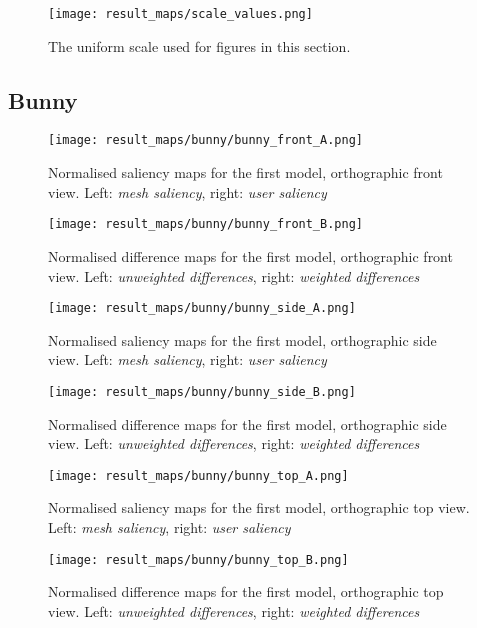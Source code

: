 \begin{figure}[htb]
	\centering
	\texttt{[image: result\_maps/scale\_values.png]}\\ %
	\caption{The uniform scale used for figures in this section.}
	\label{fig:results_scale}
\end{figure}

\FloatBarrier
		\subsection{Bunny}
		\label{sec:results_bunny}
%
%
\begin{figure}[!htb]
	\centering
	\texttt{[image: result\_maps/bunny/bunny\_front\_A.png]}\\ %
	\caption{Normalised saliency maps for the first model, orthographic front view. Left: \textit{mesh saliency}, right: \textit{user saliency}}
	\label{fig:results_bunny_front_a}
\end{figure}
\begin{figure}[!htb]
	\centering
	\texttt{[image: result\_maps/bunny/bunny\_front\_B.png]}\\ %
	\caption{Normalised difference maps for the first model, orthographic front view. Left: \textit{unweighted differences}, right: \textit{weighted differences}}
	\label{fig:results_bunny_front_b}
\end{figure}

\begin{figure}[!htb]
	\centering
	\texttt{[image: result\_maps/bunny/bunny\_side\_A.png]}\\ %
	\caption{Normalised saliency maps for the first model, orthographic side view. Left: \textit{mesh saliency}, right: \textit{user saliency}}
	\label{fig:results_bunny_side_a}
\end{figure}
\begin{figure}[!htb]
	\centering
	\texttt{[image: result\_maps/bunny/bunny\_side\_B.png]}\\ %
	\caption{Normalised difference maps for the first model, orthographic side view. Left: \textit{unweighted differences}, right: \textit{weighted differences}}
	\label{fig:results_bunny_side_b}
\end{figure}

\begin{figure}[!htb]
	\centering
	\texttt{[image: result\_maps/bunny/bunny\_top\_A.png]}\\ %
	\caption{Normalised saliency maps for the first model, orthographic top view. Left: \textit{mesh saliency}, right: \textit{user saliency}}
	\label{fig:results_bunny_top_a}
\end{figure}
\begin{figure}[!htb]
	\centering
	\texttt{[image: result\_maps/bunny/bunny\_top\_B.png]}\\ %
	\caption{Normalised difference maps for the first model, orthographic top view. Left: \textit{unweighted differences}, right: \textit{weighted differences}}
	\label{fig:results_bunny_top_b}
\end{figure}

